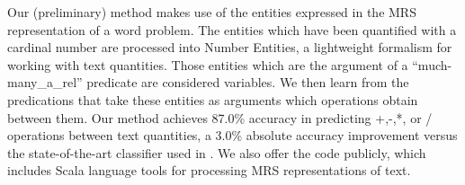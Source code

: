 Our (preliminary) method makes use of the entities expressed in the MRS representation of a word problem. 
The entities which have been quantified with a cardinal number are processed into Number Entities, a lightweight formalism for working with text quantities. 
Those entities which are the argument of a ``much-many\_a\_rel'' predicate are considered variables.
We then learn from the predications that take these entities as arguments which operations obtain between them. 
Our method achieves 87.0\% accuracy in predicting +,-,*, or / operations between text quantities, a 3.0\% absolute accuracy improvement versus the state-of-the-art classifier used in \cite{koncel2015parsing}.
We also offer the code publicly, which includes Scala language tools for processing MRS representations of text.
